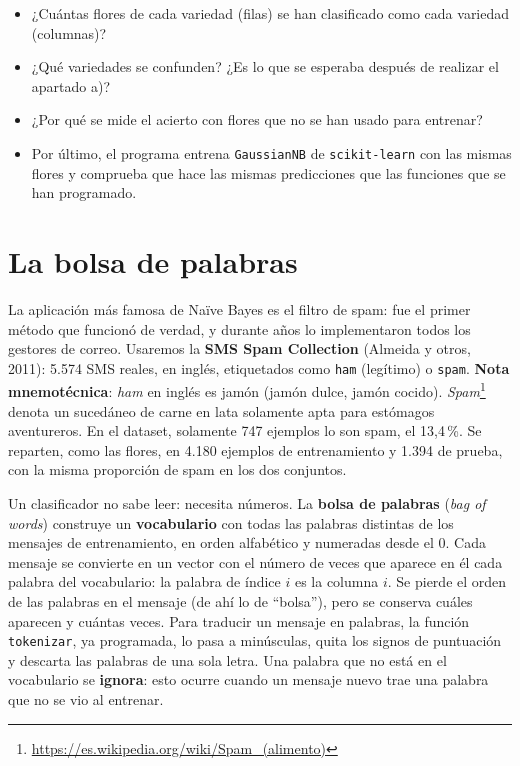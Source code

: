 \documentclass{article}
\begin{document}
\begin{exercise}[breakable]
\begin{enumerate}
    \begin{itemize}    
    	\item ¿Cuántas flores de cada variedad (filas) se han clasificado como cada variedad (columnas)? 
    \item ¿Qué variedades se confunden? ¿Es lo que se esperaba después de realizar el apartado a)? 
    \item ¿Por qué se mide el acierto con flores que no se han usado para entrenar? 
    \item Por último, el programa entrena \texttt{GaussianNB} de \texttt{scikit-learn} con las mismas flores y comprueba que hace las mismas predicciones que las funciones que se han programado.    
    \end{itemize}

\end{enumerate}
\end{exercise}


\section{La bolsa de palabras}
La aplicación más famosa de Naïve Bayes es el filtro de spam: fue el primer método que funcionó de verdad, y durante años lo implementaron todos los gestores de correo. Usaremos la \textbf{SMS Spam Collection} (Almeida y otros, 2011): 5.574 SMS reales, en inglés, etiquetados como \texttt{ham} (legítimo) o \texttt{spam}. \textbf{Nota mnemotécnica}: \textit{ham} en inglés es jamón (jamón dulce, jamón cocido).  \textit{Spam}\footnote{\url{https://es.wikipedia.org/wiki/Spam_(alimento)}} denota un sucedáneo de carne en lata solamente apta para estómagos aventureros. En el dataset, solamente 747 ejemplos lo son spam, el 13,4\,\%. Se reparten, como las flores, en 4.180 ejemplos de entrenamiento y 1.394 de prueba, con la misma proporción de spam en los dos conjuntos.

Un clasificador no sabe leer: necesita números. La \textbf{bolsa de palabras} (\textit{bag of words}) construye un \textbf{vocabulario} con todas las palabras distintas de los mensajes de entrenamiento, en orden alfabético y numeradas desde el 0. Cada mensaje se convierte en un vector con el número de veces que aparece en él cada palabra del vocabulario: la palabra de índice $i$ es la columna $i$. Se pierde el orden de las palabras en el mensaje (de ahí lo de ``bolsa''), pero se conserva cuáles aparecen y cuántas veces. Para traducir un mensaje en palabras, la función \texttt{tokenizar}, ya programada, lo pasa a minúsculas, quita los signos de puntuación y descarta las palabras de una sola letra. Una palabra que no está en el vocabulario se \textbf{ignora}: esto ocurre cuando un mensaje nuevo trae una palabra que no se vio al entrenar.
\end{document}
